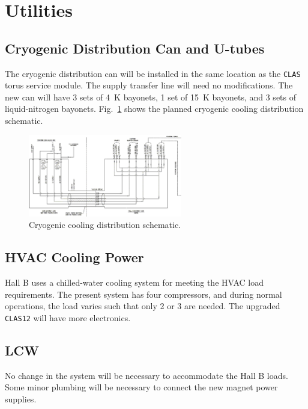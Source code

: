 \section{Utilities}

\subsection{Cryogenic Distribution Can and U-tubes}

The cryogenic distribution can will be installed in the same location as 
the {\tt CLAS} torus service module.  The supply transfer line will need no 
modifications.  The new can will have 3 sets of 4~K bayonets, 1 set of 
15~K bayonets, and 3 sets of liquid-nitrogen bayonets.  Fig.~\ref{cryoschem}
shows the planned cryogenic cooling distribution schematic.

\begin{figure}[htbp]
\centering
\includegraphics[width=0.6\textwidth]{cryoschematic.eps}
\caption{\small{Cryogenic cooling distribution schematic.}}
\label{cryoschem}
\end{figure}

\subsection{HVAC Cooling Power}

Hall B uses a chilled-water cooling system for meeting the HVAC load 
requirements.  The present system has four compressors, and during normal 
operations, the load varies such that only 2 or 3 are needed.  The 
upgraded {\tt CLAS12} will have more electronics.  

\subsection{LCW}

No change in the system will be necessary to accommodate the Hall B loads. 
Some minor plumbing will be necessary to connect the new magnet power 
supplies. 

